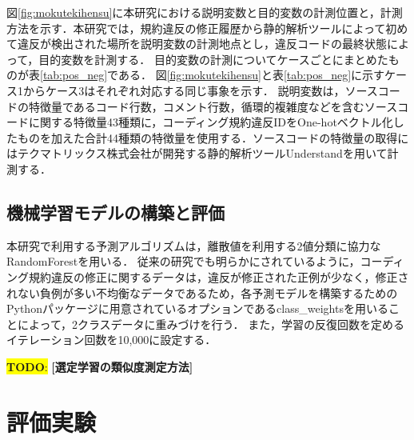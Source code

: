 \documentclass[paper]{ieicej}
\newcommand{\todo}[1]{\colorbox{yellow}{{\bf TODO}:}{\color{red} {\textbf{[#1]}}}}
\begin{document}
図\ref{fig:mokutekihensu}に本研究における説明変数と目的変数の計測位置と，計測方法を示す．本研究では，規約違反の修正履歴から静的解析ツールによって初めて違反が検出された場所を説明変数の計測地点とし，違反コードの最終状態によって，目的変数を計測する．
目的変数の計測についてケースごとにまとめたものが表\ref{tab:pos_neg}である．
図\ref{fig:mokutekihensu}と表\ref{tab:pos_neg}に示すケース1からケース3はそれぞれ対応する同じ事象を示す．
説明変数は，ソースコードの特徴量であるコード行数，コメント行数，循環的複雑度などを含むソースコードに関する特徴量43種類に，コーディング規約違反IDをOne-hotベクトル化したものを加えた合計44種類の特徴量を使用する．ソースコードの特徴量の取得にはテクマトリックス株式会社が開発する静的解析ツールUnderstandを用いて計測する．

\begin{table}[t]
    \centering
    \caption{正例と負例の分類}
    \label{tab:pos_neg}
\end{table}

\subsection{機械学習モデルの構築と評価}

本研究で利用する予測アルゴリズムは，離散値を利用する2値分類に協力なRandomForestを用いる．
従来の研究でも明らかにされているように，コーディング規約違反の修正に関するデータは，違反が修正された正例が少なく，修正されない負例が多い不均衡なデータであるため，各予測モデルを構築するためのPythonパッケージに用意されているオプションであるclass\_weightsを用いることによって，2クラスデータに重みづけを行う．
また，学習の反復回数を定めるイテレーション回数を10,000に設定する．

\todo{選定学習の類似度測定方法}

\section{評価実験}\label{chap:result}
\end{document}
